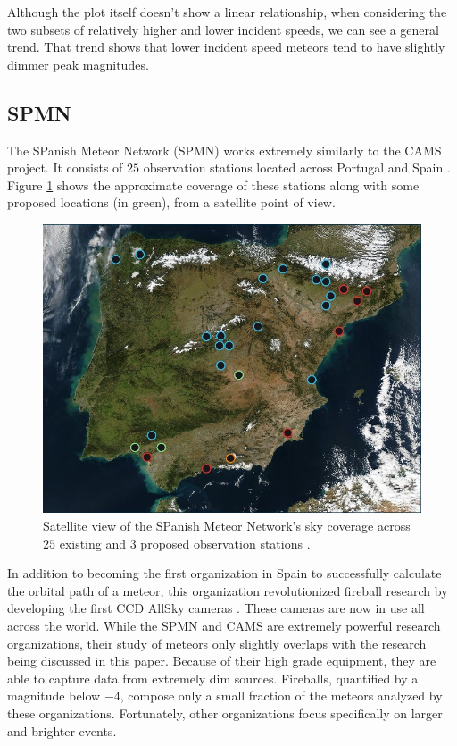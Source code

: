 Although the plot itself doesn't show a linear relationship, when considering the two subsets of relatively higher and lower incident speeds, we can see a general trend.
That trend shows that lower incident speed meteors tend to have slightly dimmer peak magnitudes. 



\subsection{SPMN}

The SPanish Meteor Network (SPMN) works extremely similarly to the CAMS project.  
It consists of $25$ observation stations located across Portugal and Spain \cite{trigo-rodriguez_2006_2007}.
Figure \ref{SPan} shows the approximate coverage of these stations along with some proposed locations (in green), from a satellite point of view.  

\begin{figure}[ht!]
  \centering
  \includegraphics[scale=0.3]{images/satalite_of_love.png}
  \caption{Satellite view of the SPanish Meteor Network's sky coverage across $25$ existing and $3$ proposed observation stations  \cite{noauthor_presentation_nodate}.}
  \label{SPan}
\end{figure}

In addition to becoming the first organization in Spain to successfully calculate the orbital path of a meteor, this organization revolutionized fireball research by developing the first CCD AllSky cameras \cite{noauthor_presentation_nodate}.
These cameras are now in use all across the world.
While the SPMN and CAMS are extremely powerful research organizations, their study of meteors only slightly overlaps with the research being discussed in this paper.
Because of their high grade equipment, they are able to capture data from extremely dim sources.
Fireballs, quantified by a magnitude below $-4$, compose only a small fraction of the meteors analyzed by these organizations.
Fortunately, other organizations focus specifically on larger and brighter events.

